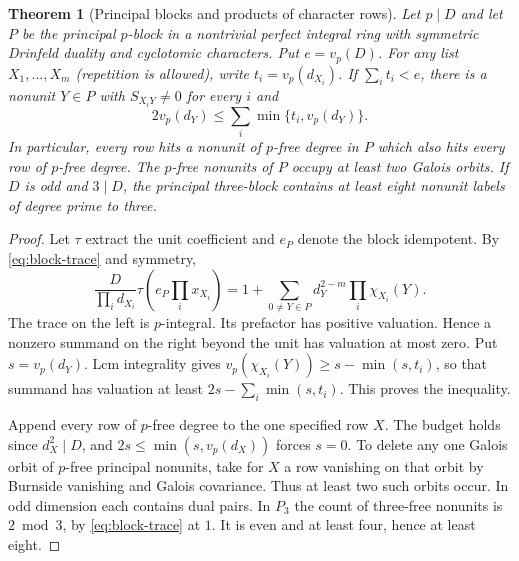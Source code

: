 \documentclass[11pt]{amsart}
\numberwithin{equation}{section}
\newtheorem{theorem}{Theorem}[section]
\theoremstyle{definition}
\theoremstyle{plain}
\begin{document}
\begin{theorem}[Principal blocks and products of character rows]
\label{rev:principal-product}
Let $p\mid D$ and let $P$ be the principal $p$-block in a nontrivial perfect integral
ring with symmetric Drinfeld duality and cyclotomic characters.
Put $e=v_p(D)$. For any list $X_1,\ldots,X_m$ (repetition is
allowed), write $t_i=v_p(d_{X_i})$. If $\sum_i t_i<e$, there is a
nonunit $Y\in P$ with $S_{X_iY}\ne0$ for every $i$ and
\[
  2v_p(d_Y)\le\sum_i\min\{t_i,v_p(d_Y)\}.
\]
In particular, every row hits a nonunit of $p$-free degree in $P$
which also hits every row of $p$-free degree. The $p$-free nonunits
of $P$ occupy at least two Galois orbits. If $D$ is odd and $3\mid D$,
the principal three-block contains at least eight nonunit labels
of degree prime to three.
\end{theorem}
\begin{proof}
Let $\tau$ extract the unit coefficient and $e_P$ denote the block
idempotent. By \eqref{eq:block-trace} and symmetry,
\[
 \frac{D}{\prod_i d_{X_i}}\tau\left(e_P\prod_i x_{X_i}\right)
 =1+\sum_{0\ne Y\in P}
       d_Y^{2-m}\prod_i\chi_{X_i}(Y).
\]
The trace on the left is $p$-integral. Its prefactor has positive
valuation. Hence a nonzero summand on the right beyond the unit has
valuation at most zero. Put $s=v_p(d_Y)$. Lcm integrality gives
$v_p(\chi_{X_i}(Y))\ge s-\min(s,t_i)$, so that summand has valuation
at least $2s-\sum_i\min(s,t_i)$. This proves the inequality.

Append every row of $p$-free degree to the one specified row $X$.
The budget holds since $d_X^2\mid D$, and $2s\le\min(s,v_p(d_X))$
forces $s=0$. To delete any one Galois orbit of $p$-free principal
nonunits, take for $X$ a row vanishing on that orbit by Burnside
vanishing and Galois covariance. Thus at least two such orbits occur.
In odd dimension each contains dual pairs. In $P_3$ the count of
three-free nonunits is $2\bmod3$, by \eqref{eq:block-trace} at $1$.
It is even and at least four, hence at least eight.
\end{proof}
\end{document}

